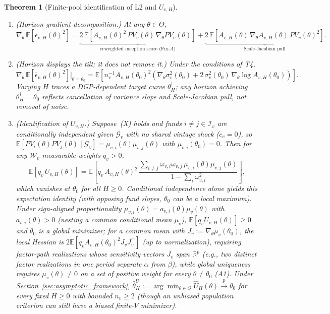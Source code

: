 \documentclass[12pt]{article}
\newtheorem{theorem}{Theorem}
\begin{document}
\begin{theorem}[Finite-pool identification of L2 and $U_{v,H}$]
\begin{enumerate}
\[  + \mathbb{E}\!\left[A_{v,H}(\theta)^2\,n_v^{-1}\,\sigma_v^2(\theta)\right],
  \]
  where $\mu_v(\theta) := \mathbb{E}[PV_v(\theta)\mid \mathcal{G}_v]$ is the conditional mean of the weighted pool and vanishes at $\theta_0$.
  \item[\textbf{T5}] \emph{(Horizon gradient decomposition.)} At any $\theta \in \Theta$,
  \[
  \nabla_\theta\,\mathbb{E}\!\left[\bar\epsilon_{v,H}(\theta)^2\right]
  = \underbrace{2\,\mathbb{E}\!\left[A_{v,H}(\theta)^2\,PV_v(\theta)\,\nabla_\theta PV_v(\theta)\right]}_{\text{reweighted inception score (Fix-}A\text{)}}
  + \underbrace{2\,\mathbb{E}\!\left[A_{v,H}(\theta)\,\nabla_\theta A_{v,H}(\theta)\,PV_v(\theta)^2\right]}_{\text{Scale-Jacobian pull}}.
  \]
  \item[\textbf{T6}] \emph{(Horizon displays the tilt; it does not remove it.)} Under the conditions of T4,
  \[
  \nabla_\theta\,\mathbb{E}\!\left[\bar\epsilon_{v,H}(\theta)^2\right]\Big|_{\theta=\theta_0}
  = \mathbb{E}\!\left[n_v^{-1}A_{v,H}(\theta_0)^2\left(\nabla_\theta\sigma_v^2(\theta_0) + 2\,\sigma_v^2(\theta_0)\,\nabla_\theta\log A_{v,H}(\theta_0)\right)\right].
  \]
  Varying $H$ traces a DGP-dependent target curve $\theta_H^\dagger$; any horizon achieving $\theta_H^\dagger = \theta_0$ reflects cancellation of variance slope and Scale-Jacobian pull, not removal of noise.
  \item[\textbf{T7}] \emph{(Identification of $U_{v,H}$.)} Suppose~(X) holds and funds $i \neq j \in \mathcal{I}_v$ are conditionally independent given $\mathcal{G}_v$ with no shared vintage shock ($c_v = 0$), so $\mathbb{E}[PV_i(\theta)PV_j(\theta)\mid \mathcal{G}_v] = \mu_{v,i}(\theta)\mu_{v,j}(\theta)$ with $\mu_{v,i}(\theta_0)=0$. Then for any $\mathcal{W}_v$-measurable weights $q_v > 0$,
  \[
  \mathbb{E}\!\left[q_v\,U_{v,H}(\theta)\right] = \mathbb{E}\!\left[q_v\,A_{v,H}(\theta)^2\,\frac{\sum_{i \neq j}\omega_{v,i}\omega_{v,j}\,\mu_{v,i}(\theta)\mu_{v,j}(\theta)}{1 - \sum_i \omega_{v,i}^2}\right],
  \]
  which vanishes at $\theta_0$ for all $H \ge 0$. Conditional independence alone yields this expectation identity (with opposing fund slopes, $\theta_0$ can be a local maximum). Under sign-aligned proportionality $\mu_{v,i}(\theta) = a_{v,i}(\theta)\mu_v(\theta)$ with $a_{v,i}(\theta) > 0$ (nesting a common conditional mean $\mu_v$), $\mathbb{E}[q_v U_{v,H}(\theta)] \ge 0$ and $\theta_0$ is a global minimizer; for a common mean with $J_v := \nabla_\theta \mu_v(\theta_0)$, the local Hessian is $2\mathbb{E}[q_v A_{v,H}(\theta_0)^2 J_v J_v^\top]$ (up to normalization), requiring factor-path realizations whose sensitivity vectors $J_v$ span $\mathbb{R}^p$ (e.g., two distinct factor realizations in one period separate $\alpha$ from $\beta$), while global uniqueness requires $\mu_v(\theta) \neq 0$ on a set of positive weight for every $\theta \neq \theta_0$ (A1). Under Section~\ref{sec:asymptotic_framework}, $\hat\theta_H^U := \arg\min_{\theta\in\Theta}\widehat{U}_H(\theta) \xrightarrow{p} \theta_0$ for every fixed $H \ge 0$ with bounded $n_v \ge 2$ (though an unbiased population criterion can still have a biased finite-$V$ minimizer).

\end{enumerate}
\end{theorem}
\end{document}
